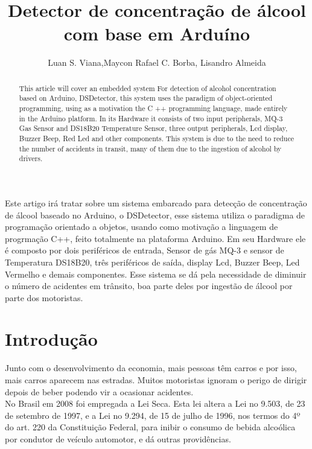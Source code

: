 \documentclass[12pt]{article}
\title{Detector de concentração de álcool com base em
Arduíno}
\author{Luan S. Viana\inst{1},Maycon Rafael C. Borba\inst{2}, Lisandro Almeida\inst{3}}
\begin{document}
 

\maketitle

\begin{abstract}
  This article will cover an embedded system
For detection of alcohol concentration based on Arduino, DSDetector, this system uses the paradigm of object-oriented programming, using as a motivation the C ++ programming language, made entirely in the Arduino platform. In its Hardware it consists of two input peripherals, MQ-3 Gas Sensor and DS18B20 Temperature Sensor, three output peripherals, Lcd display, Buzzer Beep, Red Led and other components. This system is due to the need to reduce the number of accidents in transit, many of them due to the ingestion of alcohol by drivers.
\end{abstract}
     
\begin{resumo} 
  Este artigo irá tratar sobre um sistema embarcado
para detecção de concentração de álcool baseado no Arduino, o DSDetector, esse sistema utiliza o paradigma de programação orientado a objetos, usando como motivação a linguagem de progrmação C++, feito totalmente na plataforma Arduino. Em seu Hardware ele é composto por dois periféricos de entrada, Sensor de gás MQ-3 e sensor de Temperatura DS18B20, três periféricos de saída, display Lcd, Buzzer Beep, Led Vermelho e demais componentes. Esse sistema se dá pela necessidade de diminuir o número de acidentes em trânsito, boa parte deles por ingestão de álcool por parte dos motoristas.

\end{resumo}


\section{Introdução}

Junto com o desenvolvimento da economia, mais pessoas têm
carros e por isso, mais carros aparecem nas estradas. Muitos motoristas ignoram o perigo de dirigir depois de beber podendo vir a ocasionar acidentes.\\ No Brasil em 2008 foi empregada a Lei Seca. Esta lei altera a Lei no 9.503, de 23 de setembro de 1997, e a
Lei no 9.294, de 15 de julho de 1996, nos termos do 4º do
art. 220 da Constituição Federal, para inibir o consumo de
bebida alcoólica por condutor de veículo automotor, e dá
outras providências.
\end{document}
